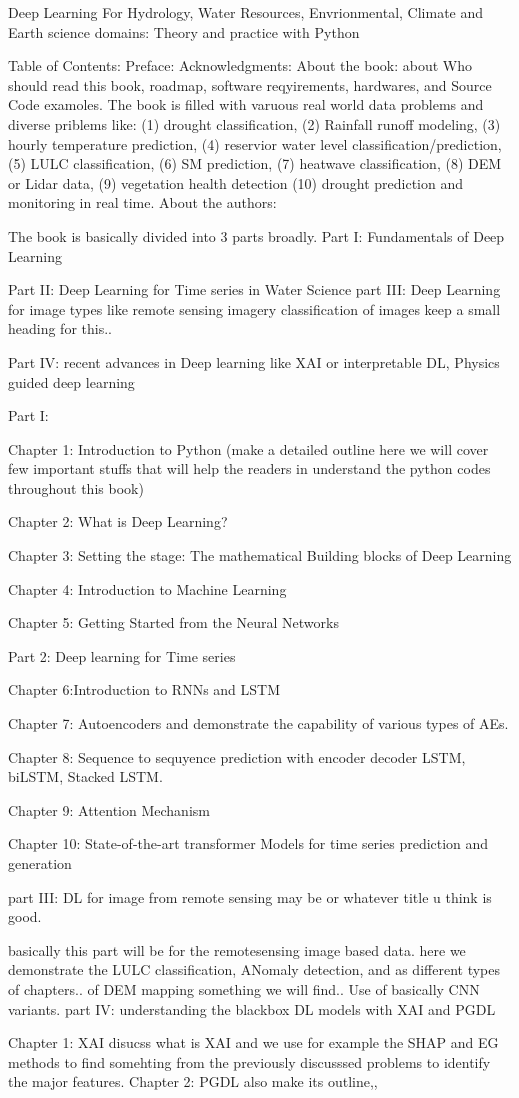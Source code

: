 Deep Learning For Hydrology, Water Resources, Envrionmental, Climate and Earth science domains: Theory and practice with Python


Table of Contents:
Preface:
Acknowledgments:
About the book: about Who should read this book, roadmap, software reqyirements, hardwares, and Source Code examoles. 
The book is filled with varuous real world data problems and diverse priblems like: 
(1) drought classification, (2) Rainfall runoff modeling, (3) hourly temperature prediction, (4) reservior water level classification/prediction, (5) LULC classification, (6) SM prediction, (7)  heatwave classification, (8) DEM or Lidar data, (9) vegetation health detection (10) drought prediction and monitoring in real time. 
About the authors:


The book is basically divided into 3 parts broadly. 
Part I: Fundamentals of Deep Learning

Part II: Deep Learning for Time series in Water Science
part III: Deep Learning for image types like remote sensing imagery classification of images keep a small heading for this.. 

Part IV: recent advances in Deep learning like XAI or interpretable DL, Physics guided deep learning 

Part I: 

Chapter 1: Introduction to Python (make a detailed outline here we will cover few important stuffs that will help the readers in understand the python codes throughout this book)

Chapter 2: What is Deep Learning? 

Chapter 3: Setting the stage: The mathematical Building blocks of Deep Learning

Chapter 4: Introduction to Machine Learning

Chapter 5: Getting Started from the Neural Networks

Part 2: Deep learning for Time series 

Chapter 6:Introduction to RNNs and LSTM

Chapter 7: Autoencoders and demonstrate the capability of various types of AEs.

Chapter 8: Sequence to sequyence prediction with encoder decoder LSTM, biLSTM, Stacked LSTM.

Chapter 9: Attention Mechanism

Chapter 10: State-of-the-art transformer Models for time series prediction and generation

part III: DL for image from remote sensing may be or whatever title u think is good. 

basically this part will be for the remotesensing image based data. 
here we demonstrate the LULC classification, ANomaly detection, and as different types of chapters.. of DEM mapping something we will find.. 
Use of basically CNN variants. 
part IV: understanding the blackbox DL models with XAI and PGDL

Chapter 1: XAI
disucss what is XAI and we use for example the SHAP and EG methods to find somehting from the previously discusssed problems to identify the major features. 
Chapter 2: PGDL also make its outline,, 



